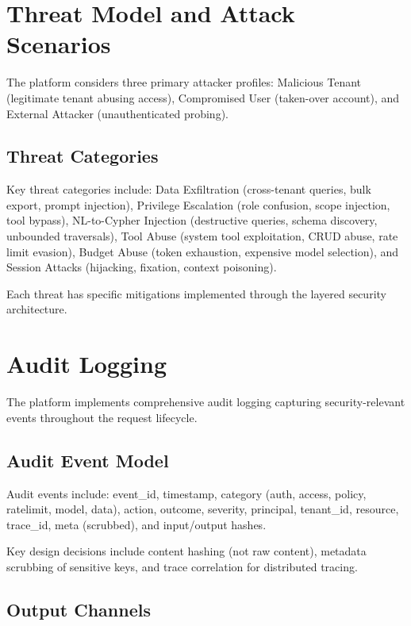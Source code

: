 \documentclass[a4paper,twoside]{sapthesis}
\begin{document}
\section{Threat Model and Attack Scenarios}
\label{sec:threat-model}

The platform considers three primary attacker profiles: Malicious Tenant (legitimate tenant abusing access), Compromised User (taken-over account), and External Attacker (unauthenticated probing).

\subsection{Threat Categories}
\label{subsec:threat-categories}

Key threat categories include: Data Exfiltration (cross-tenant queries, bulk export, prompt injection), Privilege Escalation (role confusion, scope injection, tool bypass), NL-to-Cypher Injection (destructive queries, schema discovery, unbounded traversals), Tool Abuse (system tool exploitation, CRUD abuse, rate limit evasion), Budget Abuse (token exhaustion, expensive model selection), and Session Attacks (hijacking, fixation, context poisoning).

Each threat has specific mitigations implemented through the layered security architecture.

\section{Audit Logging}
\label{sec:audit-logging}

The platform implements comprehensive audit logging capturing security-relevant events throughout the request lifecycle.

\subsection{Audit Event Model}
\label{subsec:audit-event-model}

Audit events include: event\_id, timestamp, category (auth, access, policy, ratelimit, model, data), action, outcome, severity, principal, tenant\_id, resource, trace\_id, meta (scrubbed), and input/output hashes.

Key design decisions include content hashing (not raw content), metadata scrubbing of sensitive keys, and trace correlation for distributed tracing.

\subsection{Output Channels}
\label{subsec:audit-channels}
\end{document}
